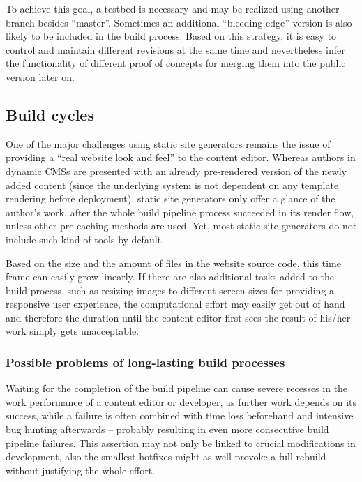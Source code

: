 To achieve this goal, a testbed is necessary and may be realized using another branch besides ``master''. Sometimes an additional ``bleeding edge'' version is also likely to be included in the build process. Based on this strategy, it is easy to control and maintain different revisions at the same time and nevertheless infer the functionality of different proof of concepts for merging them into the public version later on.


\subsection{Build cycles}
\label{sec:challenges-buildcyclecompletion}

One of the major challenges using static site generators remains the issue of providing a ``real website look and feel'' to the content editor. Whereas authors in dynamic CMSs are presented with an already pre-rendered version of the newly added content (since the underlying system is not dependent on any template rendering before deployment), static site generators only offer a glance of the author's work, after the whole build pipeline process succeeded in its render flow, unless other pre-caching methods are used. Yet, most static site generators do not include such kind of tools by default.

Based on the size and the amount of files in the website source code, this time frame can easily grow linearly. If there are also additional tasks added to the build process, such as resizing images to different screen sizes for providing a  responsive user experience, the computational effort may easily get out of hand and therefore the duration until the content editor first sees the result of his/her work simply gets unacceptable.

\subsubsection{Possible problems of long-lasting build processes}
Waiting for the completion of the build pipeline can cause severe recesses in the work performance of a content editor or developer, as further work depends on its success, while a failure is often combined with time loss beforehand and intensive bug hunting afterwards -- probably resulting in even more consecutive build pipeline failures. This assertion may not only be linked to crucial modifications in development, also the smallest hotfixes might as well provoke a full rebuild without justifying the whole effort.

